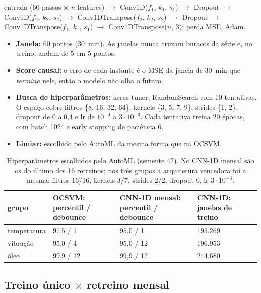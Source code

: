 \documentclass[11pt,a4paper]{article}
\begin{document}
\begin{center}\small
entrada (60 passos $\times$ $n$ features) $\to$ Conv1D($f_1$, $k_1$, $s_1$) $\to$ Dropout $\to$ Conv1D($f_2$, $k_2$, $s_2$)
$\to$ Conv1DTranspose($f_2$, $k_2$, $s_2$) $\to$ Dropout $\to$ Conv1DTranspose($f_1$, $k_1$, $s_1$) $\to$
Conv1DTranspose($n$, 3); perda MSE, Adam.
\end{center}

\begin{itemize}
  \item \textbf{Janela:} 60 pontos (30~min). As janelas nunca cruzam buracos da série e, no treino, andam de 5 em 5
        pontos.
  \item \textbf{Score causal:} o erro de cada instante é o MSE da janela de 30~min que \emph{termina} nele, então o
        modelo não olha o futuro.
  \item \textbf{Busca de hiperparâmetros:} keras-tuner, RandomSearch com 10 tentativas. O espaço cobre filtros
        \{8, 16, 32, 64\}, kernels \{3, 5, 7, 9\}, strides \{1, 2\}, dropout de 0 a 0,4 e lr de $10^{-4}$ a
        $3\cdot10^{-3}$. Cada tentativa treina 20 épocas, com batch 1024 e early stopping de paciência 6.
  \item \textbf{Limiar:} escolhido pelo AutoML da mesma forma que na OCSVM.
\end{itemize}

\begin{table}[H]
\centering\small
\caption{Hiperparâmetros escolhidos pelo AutoML (semente 42). No CNN-1D mensal são os do último dos 16 retreinos;
nos três grupos a arquitetura vencedora foi a mesma: filtros 16/16, kernels 3/7, strides 2/2, dropout 0, lr
$3\cdot10^{-3}$.}
\label{tab:hiper}
\begin{tabular}{lllll}
\toprule
grupo & OCSVM: percentil / debounce & CNN-1D mensal: percentil / debounce & CNN-1D: janelas de treino \\
\midrule
temperatura & 97,5 / 1 & 95,0 / 1 & 195.269 \\
vibração & 95,0 / 4 & 95,0 / 12 & 196.953 \\
óleo & 99,9 / 12 & 99,9 / 12 & 244.680 \\
\bottomrule
\end{tabular}
\end{table}

\subsection{Treino único $\times$ retreino mensal}
\end{document}
